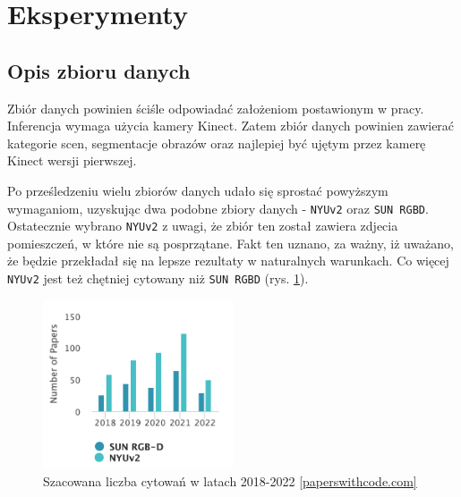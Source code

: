 \newpage %
\section{Eksperymenty}
\subsection{Opis zbioru danych}

Zbiór danych powinien ściśle odpowiadać założeniom postawionym w pracy. Inferencja wymaga użycia kamery Kinect. Zatem zbiór danych powinien zawierać kategorie scen, segmentacje obrazów oraz najlepiej być ujętym przez kamerę Kinect wersji pierwszej.

Po prześledzeniu wielu zbiorów danych udało się sprostać powyższym wymaganiom, uzyskując dwa podobne zbiory danych - \texttt{NYUv2} oraz \texttt{SUN RGBD}. Ostatecznie wybrano \texttt{NYUv2} z uwagi, że zbiór ten został zawiera zdjecia
pomieszczeń, w które nie są posprzątane. Fakt ten uznano, za ważny, iż uważano, że będzie przekładał się na lepsze rezultaty w naturalnych warunkach. Co więcej \texttt{NYUv2} jest też chętniej cytowany niż \texttt{SUN RGBD} (rys. \ref{fig:sun-vs-nyu}).

\begin{figure}
    \centering
    \includegraphics[width=0.5\textwidth]{img/stats-dataset.png}
    \caption[]{Szacowana liczba cytowań w latach 2018-2022 \href{https://paperswithcode.com/dataset/sun-rgb-d}{[paperswithcode.com]}}
    \label{fig:sun-vs-nyu}
\end{figure}

